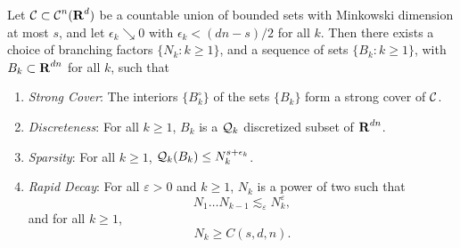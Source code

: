 \begin{lemma}\label{coveringLemma}
	Let $\operatorname{\mathcal{C}} \subset \operatorname{\mathcal{C}}^n(\operatorname{\mathbf{R}}^d)$ be a countable union of bounded sets with Minkowski dimension at most $s$, and let $\epsilon_k \searrow 0$ with $\epsilon_k < (dn - s)/2$ for all $k$. Then there exists a choice of branching factors $\{ N_k : k \geq 1 \}$, and a sequence of sets $\{ B_k : k \geq 1 \}$, with $B_k \subset \operatorname{\mathbf{R}}^{dn}$ for all $k$, such that
	\begin{enumerate}
		\item\label{StrongCoverProperty} \emph{Strong Cover}: The interiors $\{ B_k^\circ \}$ of the sets $\{ B_k \}$ form a strong cover of $\operatorname{\mathcal{C}}$.

		\item\label{DiscretenessProperty} \emph{Discreteness}: For all $k \geq 1$, $B_k$ is a $\operatorname{\mathcal{Q}}_k$ discretized subset of $\operatorname{\mathbf{R}}^{dn}$.

		\item\label{SparsityProperty} \emph{Sparsity}: For all $k \geq 1$, $\operatorname{\mathcal{Q}}_k(B_k) \leq N_k^{s+\epsilon_k}$.

		\item \label{RapidDecayProperty} \emph{Rapid Decay}: For all $\varepsilon > 0$ and $k \geq 1$, $N_k$ is a power of two such that
		\[ N_1 \dots N_{k-1} \lesssim_\varepsilon N_k^\varepsilon, \]
		and for all $k \geq 1$,
		\[ N_k \geq C(s,d,n). \]
	\end{enumerate}
\end{lemma}
